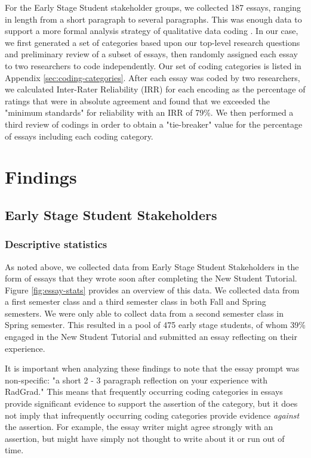 \documentclass[acmsmall]{acmart}
\begin{document}
For the Early Stage Student stakeholder groups, we collected 187 essays, ranging in length from a short paragraph to several paragraphs. This was enough data to support a more formal analysis strategy of qualitative data coding \cite{braun_successful_2013}. In our case, we first generated a set of categories based upon our top-level research questions and preliminary review of a subset of essays, then randomly assigned each essay to two researchers to code independently. Our set of coding categories is listed in Appendix \ref{sec:coding-categories}. After each essay was coded by two researchers, we calculated Inter-Rater Reliability (IRR) for each encoding as the percentage of ratings that were in absolute agreement and found that we exceeded the "minimum standards" for reliability \cite{graham_measuring_2012} with an IRR of 79\%. We then performed a third review of codings in order to obtain a "tie-breaker" value for the percentage of essays including each coding category.

\section{Findings}

\subsection{Early Stage Student Stakeholders}

\subsubsection{Descriptive statistics}

As noted above, we collected data from Early Stage Student Stakeholders in the form of essays that they wrote soon after completing the New Student Tutorial.  Figure \ref{fig:essay-stats} provides an overview of this data. We collected data from a first semester class and a third semester class in both Fall and Spring semesters. We were only able to collect data from a second semester class in Spring semester. This resulted in a pool of 475 early stage students, of whom 39\% engaged in the New Student Tutorial and submitted an essay reflecting on their experience.

It is important when analyzing these findings to note that the essay prompt was non-specific: "a short 2 - 3 paragraph reflection on your experience with RadGrad."  This means that frequently occurring coding categories in essays provide significant evidence to support the assertion of the category, but it does not imply that infrequently occurring coding categories provide evidence {\em against} the assertion. For example, the essay writer might agree strongly with an assertion, but might have simply not thought to write about it or run out of time.
\end{document}
